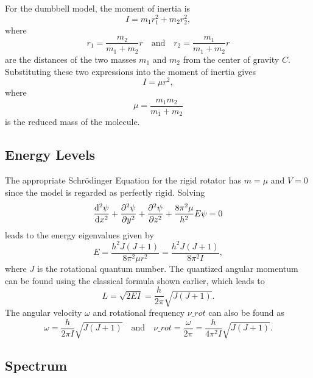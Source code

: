 For the dumbbell model, the moment of inertia is
\begin{equation*}
    I = m_{1}r_{1}^{2} + m_{2}r_{2}^{2},
\end{equation*}
where
\begin{equation*}
    r_{1} = \frac{m_{2}}{m_{1} + m_{2}}r \quad\text{and}\quad r_{2} = \frac{m_{1}}{m_{1} + m_{2}}r
\end{equation*}
are the distances of the two masses $m_{1}$ and $m_{2}$ from the center of gravity $C$. Substituting these two expressions into the moment of inertia gives
\begin{equation*}
    I = \mu r^{2},
\end{equation*}
where
\begin{equation*}
    \mu = \frac{m_{1}m_{2}}{m_{1} + m_{2}}
\end{equation*}
is the reduced mass of the molecule.

\subsection{Energy Levels}

The appropriate Schr\"odinger Equation for the rigid rotator has $m = \mu$ and $V = 0$ since the model is regarded as perfectly rigid. Solving
\begin{equation*}
    \odv[2]{\psi}{x} + \pdv[2]{\psi}{y} + \pdv[2]{\psi}{z} + \frac{8\pi^{2}\mu}{h^{2}}E\psi = 0
\end{equation*}
leads to the energy eigenvalues given by
\begin{equation*}
    E = \frac{h^{2}J(J + 1)}{8\pi^{2}\mu r^{2}} = \frac{h^{2}J(J + 1)}{8\pi^{2}I},
\end{equation*}
where $J$ is the rotational quantum number. The quantized angular momentum can be found using the classical formula shown earlier, which leads to
\begin{equation*}
    L = \sqrt{2EI} = \frac{h}{2\pi}\sqrt{J(J + 1)}.
\end{equation*}
The angular velocity $\omega$ and rotational frequency $\nu\_{rot}$ can also be found as
\begin{equation*}
    \omega = \frac{h}{2\pi I}\sqrt{J(J + 1)} \quad\text{and}\quad \nu\_{rot} = \frac{\omega}{2\pi} = \frac{h}{4\pi^{2}I}\sqrt{J(J + 1)}.
\end{equation*}

\subsection{Spectrum}

